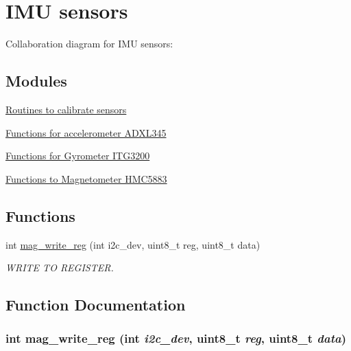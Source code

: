 \hypertarget{group__imu}{
\section{IMU sensors}
\label{group__imu}
}


Collaboration diagram for IMU sensors:

\subsection*{Modules}
\begin{DoxyCompactItemize}
\item 
\hyperlink{group__calibrate}{Routines to calibrate sensors}
\item 
\hyperlink{group__acc}{Functions for accelerometer ADXL345}
\item 
\hyperlink{group__gyr}{Functions for Gyrometer ITG3200}
\item 
\hyperlink{group__mag}{Functions to Magnetometer HMC5883}
\end{DoxyCompactItemize}
\subsection*{Functions}
\begin{DoxyCompactItemize}
\item 
int \hyperlink{group__imu_gab5d0ae421cd4bb10b1b7a1eda167416b}{mag\_\-write\_\-reg} (int i2c\_\-dev, uint8\_\-t reg, uint8\_\-t data)
\begin{DoxyCompactList}\small\item\em WRITE TO REGISTER. \item\end{DoxyCompactList}\end{DoxyCompactItemize}


\subsection{Function Documentation}
\hypertarget{group__imu_gab5d0ae421cd4bb10b1b7a1eda167416b}{
\subsubsection[{mag\_\-write\_\-reg}]{\setlength{\rightskip}{0pt plus 5cm}int mag\_\-write\_\-reg (int {\em i2c\_\-dev}, \/  uint8\_\-t {\em reg}, \/  uint8\_\-t {\em data})}}
\label{group__imu_gab5d0ae421cd4bb10b1b7a1eda167416b}


